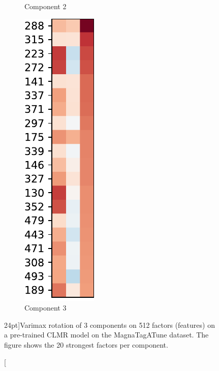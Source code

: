 \begin{figure}[h]
\begin{subfigure}[b]{0.3\textwidth}
        \caption{Component 2}
    \end{subfigure}
    \hfill
    \begin{subfigure}[b]{0.3\textwidth}
        \centering
        \includegraphics[width=\textwidth]{figs/varimax-magnatagatune-2.pdf}
        \caption{Component 3}
    \end{subfigure}
    \caption[][24pt]{Varimax rotation of 3 components on 512 factors (features) on a pre-trained CLMR model on the MagnaTagATune dataset. The figure shows the 20 strongest factors per component.}
    \label{fig:varimax_rotation}
\end{figure}

